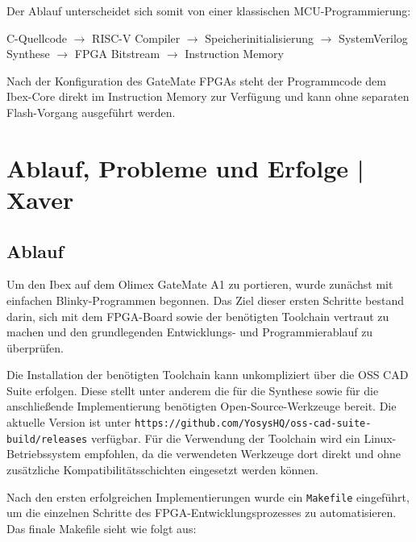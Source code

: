 \documentclass[a4paper,11pt]{article}
\begin{document}
Der Ablauf unterscheidet sich somit von einer klassischen MCU-Programmierung:

\begin{center}
	C-Quellcode $\rightarrow$ RISC-V Compiler $\rightarrow$ Speicherinitialisierung $\rightarrow$ SystemVerilog Synthese $\rightarrow$ FPGA Bitstream $\rightarrow$ Instruction Memory
\end{center}

Nach der Konfiguration des GateMate FPGAs steht der Programmcode dem Ibex-Core direkt im Instruction Memory zur Verfügung und kann ohne separaten Flash-Vorgang ausgeführt werden.

\section{Ablauf, Probleme und Erfolge | Xaver}
\subsection{Ablauf}

Um den Ibex auf dem Olimex GateMate A1 zu portieren, wurde zunächst mit einfachen Blinky-Programmen begonnen. Das Ziel dieser ersten Schritte bestand darin, sich mit dem FPGA-Board sowie der benötigten Toolchain vertraut zu machen und den grundlegenden Entwicklungs- und Programmierablauf zu überprüfen.

Die Installation der benötigten Toolchain kann unkompliziert über die OSS CAD Suite erfolgen. Diese stellt unter anderem die für die Synthese sowie für die anschließende Implementierung benötigten Open-Source-Werkzeuge bereit. Die aktuelle Version ist unter \verb|https://github.com/YosysHQ/oss-cad-suite-build/releases| verfügbar. Für die Verwendung der Toolchain wird ein Linux-Betriebssystem empfohlen, da die verwendeten Werkzeuge dort direkt und ohne zusätzliche Kompatibilitätsschichten eingesetzt werden können.

Nach den ersten erfolgreichen Implementierungen wurde ein \texttt{Makefile} eingeführt, um die einzelnen Schritte des FPGA-Entwicklungsprozesses zu automatisieren. Das finale Makefile sieht wie folgt aus:
\end{document}
